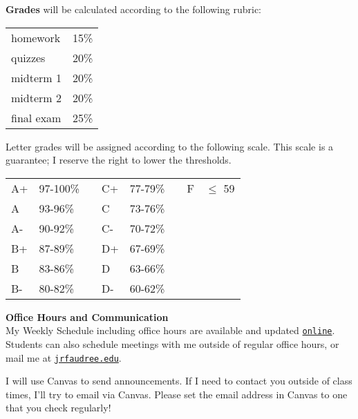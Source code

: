 \documentclass[12pt]{article}
\renewcommand{\emph}[1]{\textsf{\textbf{#1}}}
\newcommand{\localhead}[1]{\par\smallskip\textbf{#1}\nobreak\\}%
\def\heading#1{\localhead{\large\emph{#1}}}
\begin{document}
\begin{multicols}{2}
\textbf{Grades} will be calculated according to the following rubric:


\begin{tabular}{|l|c|}
  \hline
  homework & 15\% \\
  quizzes & 20\%\\
  midterm 1 & 20\%\\
  midterm 2 & 20\%\\
  final exam & 25\% \\
  \hline
\end{tabular}
\end{multicols}

\begin{multicols}{2}
Letter grades will be assigned according to the following scale. This scale is a guarantee; I reserve the right to lower the thresholds.

\begin{tabular}{| llllllll |}
\hline
A+&97-100\%& \hspace{.1in}&C+&77-79\%& \hspace{.1in}&F&$\leq$ 59\\
A&93-96\%&&C&73-76\%&&&\\
A-&90-92\%&&C-&70-72\%&&&\\
B+&87-89\%& \hspace{.1in}&D+&67-69\%&&&\\
B&83-86\%&&D&63-66\%&&&\\
B-&80-82\%&&D-&60-62\%&&&\\
\hline
\end{tabular} 

\end{multicols}

\heading{Office Hours and Communication}
My Weekly Schedule including office hours are available and updated \href{https://docs.google.com/spreadsheets/d/1o710N0-GCNc8ICkVuf-IIC80N04p9w9wGnPADjhTMv0/pubhtml}{\texttt{online}}.  Students can also schedule meetings with me outside of regular office hours, or mail me at \href{mailto:jrfaudree@alaska.edu}{\texttt{jrfaudree\@@alaska.edu}}.

I will use Canvas to send announcements.  If I need to contact you outside of class times, I'll try to email via Canvas.  Please set the email address in Canvas to one that you check regularly!


\end{document}
